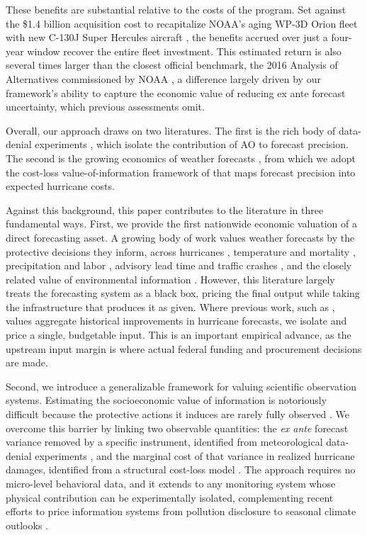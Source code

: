 \documentclass[12pt]{article}%
\begin{document}
These benefits are substantial relative to the costs of the program. Set against the \$1.4 billion acquisition cost to recapitalize NOAA's aging WP-3D Orion fleet with new C-130J Super Hercules aircraft \citep{GAO2025HurricaneHunter}, the benefits accrued over just a four-year window recover the entire fleet investment. This estimated return is also several times larger than the closest official benchmark, the 2016 Analysis of Alternatives commissioned by NOAA \citep{ANSER2016ExternalBenefits}, a difference largely driven by our framework's ability to capture the economic value of reducing ex ante forecast uncertainty, which previous assessments omit.

Overall, our approach draws on two literatures. The first is the rich body of data-denial experiments \citep{Franklin_DeMaria1992, BurpeeEA1996, MajumdarEA2013, Majumdar2016, SippelEA2022, DitchekEA2023}, which isolate the contribution of AO to forecast precision. The second is the growing economics of weather forecasts \citep{shrader2026weather, molina2024social}, from which we adopt the cost-loss value-of-information framework of \citet{molina2024social} that maps forecast precision into expected hurricane costs.

Against this background, this paper contributes to the literature in three fundamental ways. First, we provide the first nationwide economic valuation of a direct forecasting asset. A growing body of work values weather forecasts by the protective decisions they inform, across hurricanes \citep{molina2024social}, temperature and mortality \citep{shrader2023fatal, shrader2026weather}, precipitation and labor \citep{downey2023rain}, advisory lead time and traffic crashes \citep{anand2025forecasts}, and the closely related value of environmental information \citep{barwick2024fog}. However, this literature largely treats the forecasting system as a black box, pricing the final output while taking the infrastructure that produces it as given. Where previous work, such as \citet{molina2024social}, values aggregate historical improvements in hurricane forecasts, we isolate and price a single, budgetable input. This is an important empirical advance, as the upstream input margin is where actual federal funding and procurement decisions are made. 

Second, we introduce a generalizable framework for valuing scientific observation systems. Estimating the socioeconomic value of information is notoriously difficult because the protective actions it induces are rarely fully observed \citep{molina2024social, shrader2026weather}. We overcome this barrier by linking two observable quantities: the \emph{ex ante} forecast variance removed by a specific instrument, identified from meteorological data-denial experiments \citep{DitchekEA2023}, and the marginal cost of that variance in realized hurricane damages, identified from a structural cost-loss model \citep{molina2024social}. The approach requires no micro-level behavioral data, and it extends to any monitoring system whose physical contribution can be experimentally isolated, complementing recent efforts to price information systems from pollution disclosure \citep{barwick2024fog} to seasonal climate outlooks \citep{lemoine2024financial}. 
\end{document}
